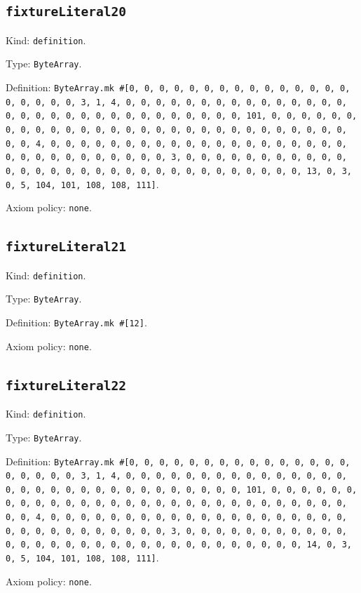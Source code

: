 \documentclass[11pt]{article}
\begin{document}
\subsection*{\texttt{fixtureLiteral20}}
\noindent Kind: \texttt{definition}.\par
\noindent Type: \texttt{ByteArray}.\par
\noindent Definition: \texttt{ByteArray.mk \#[0, 0, 0, 0, 0, 0, 0, 0, 0, 0, 0, 0, 0, 0, 0, 0, 0, 0, 0, 0, 3, 1, 4, 0, 0, 0, 0, 0, 0, 0, 0, 0, 0, 0, 0, 0, 0, 0, 0, 0, 0, 0, 0, 0, 0, 0, 0, 0, 0, 0, 0, 0, 0, 0, 101, 0, 0, 0, 0, 0, 0, 0, 0, 0, 0, 0, 0, 0, 0, 0, 0, 0, 0, 0, 0, 0, 0, 0, 0, 0, 0, 0, 0, 0, 0, 0, 4, 0, 0, 0, 0, 0, 0, 0, 0, 0, 0, 0, 0, 0, 0, 0, 0, 0, 0, 0, 0, 0, 0, 0, 0, 0, 0, 0, 0, 0, 0, 0, 3, 0, 0, 0, 0, 0, 0, 0, 0, 0, 0, 0, 0, 0, 0, 0, 0, 0, 0, 0, 0, 0, 0, 0, 0, 0, 0, 0, 0, 0, 0, 0, 13, 0, 3, 0, 5, 104, 101, 108, 108, 111]}.\par
\noindent Axiom policy: \texttt{none}.\par
\subsection*{\texttt{fixtureLiteral21}}
\noindent Kind: \texttt{definition}.\par
\noindent Type: \texttt{ByteArray}.\par
\noindent Definition: \texttt{ByteArray.mk \#[12]}.\par
\noindent Axiom policy: \texttt{none}.\par
\subsection*{\texttt{fixtureLiteral22}}
\noindent Kind: \texttt{definition}.\par
\noindent Type: \texttt{ByteArray}.\par
\noindent Definition: \texttt{ByteArray.mk \#[0, 0, 0, 0, 0, 0, 0, 0, 0, 0, 0, 0, 0, 0, 0, 0, 0, 0, 0, 0, 3, 1, 4, 0, 0, 0, 0, 0, 0, 0, 0, 0, 0, 0, 0, 0, 0, 0, 0, 0, 0, 0, 0, 0, 0, 0, 0, 0, 0, 0, 0, 0, 0, 0, 101, 0, 0, 0, 0, 0, 0, 0, 0, 0, 0, 0, 0, 0, 0, 0, 0, 0, 0, 0, 0, 0, 0, 0, 0, 0, 0, 0, 0, 0, 0, 0, 4, 0, 0, 0, 0, 0, 0, 0, 0, 0, 0, 0, 0, 0, 0, 0, 0, 0, 0, 0, 0, 0, 0, 0, 0, 0, 0, 0, 0, 0, 0, 0, 3, 0, 0, 0, 0, 0, 0, 0, 0, 0, 0, 0, 0, 0, 0, 0, 0, 0, 0, 0, 0, 0, 0, 0, 0, 0, 0, 0, 0, 0, 0, 0, 14, 0, 3, 0, 5, 104, 101, 108, 108, 111]}.\par
\noindent Axiom policy: \texttt{none}.\par
\end{document}
